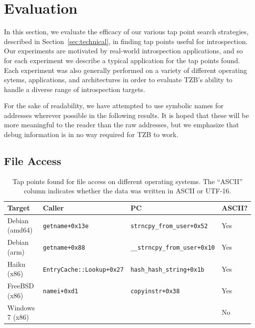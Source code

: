 \section{Evaluation}
\label{sec:eval}

In this section, we evaluate the efficacy of our various tap point search
strategies, described in Section~\ref{sec:technical}, in finding tap
points useful for introspection. Our experiments are motivated by
real-world introspection applications, and so for each experiment we
describe a typical application for the tap points found. Each experiment
was also generally performed on a variety of different operating sytems,
applications, and architectures in order to evaluate TZB's ability to
handle a diverse range of introspection targets.

For the sake of readability, we have attempted to use symbolic names for
addresses wherever possible in the following results. It is hoped that
these will be more meaningful to the reader than the raw addresses, but
we emphasize that debug information is in no way required for TZB to
work.

\subsection{File Access}
\label{sec:eval:subsec:file}

\begin{table}
    \centering
    \begin{tabular}{|l|l|l|l|}
        \hline
        Target & Caller & PC & ASCII? \\
        \hline
        Debian (amd64) & \texttt{getname+0x13e} & \texttt{strncpy\_from\_user+0x52} & Yes \\ 
        Debian (arm) & \texttt{getname+0x88} & \texttt{\_\_strncpy\_from\_user+0x10} & Yes \\
        Haiku (x86) & \texttt{EntryCache::Lookup+0x27} & \texttt{hash\_hash\_string+0x1b} & Yes \\
        FreeBSD (x86) & \texttt{namei+0xd1} & \texttt{copyinstr+0x38} & Yes \\
        Windows 7 (x86) & \fixme{} & \fixme{} & No \\
        \hline
    \end{tabular}
\caption{Tap points found for file access on different operating
systems. The ``ASCII'' column indicates whether the data was written in
ASCII or UTF-16.}
\label{tbl:file}
\end{table}

